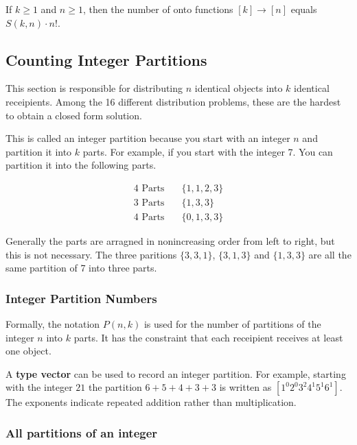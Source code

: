 \documentclass{article}
\begin{document}
\begin{thm}
    If $k \ge 1$ and $n \ge 1$, then the number of onto functions $[k] \rightarrow [n]$ equals $S(k,n) \cdot n!$.
\end{thm}

\subsection{Counting Integer Partitions}

This section is responsible for distributing $n$ identical objects into $k$ identical receipients. Among the 16 different distribution problems, these are the hardest to obtain a closed form solution.

\medskip
This is called an integer partition because you start with an integer $n$ and partition it into $k$ parts. For example, if you start with the integer 7. You can partition it into the following parts.

\begin{align*}
    \text{4 Parts} \quad & \{1, 1, 2, 3\} \\
    \text{3 Parts} \quad & \{1, 3, 3\} \\
    \text{4 Parts} \quad & \{0, 1, 3, 3\}
\end{align*}

Generally the parts are arragned in nonincreasing order from left to right, but this is not necessary. The three paritions $\{3, 3, 1\}$, $\{3, 1, 3\}$ and $\{1, 3, 3\}$ are all the same partition of 7 into three parts.

\subsubsection{Integer Partition Numbers}

Formally, the notation $P(n,k)$ is used for the number of partitions of the integer $n$ into $k$ parts. It has the constraint that each receipient receives at least one object.

\medskip
A \textbf{type vector} can be used to record an integer partition. For example, starting with the integer $21$ the partition $6 + 5+ 4 + 3 + 3$ is written as $[1^0 2^0 3^2 4^1 5^1 6^1]$. The exponents indicate repeated addition rather than multiplication.

\subsubsection{All partitions of an integer}
\end{document}
